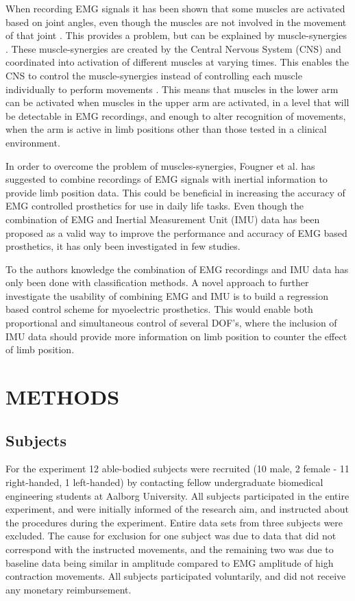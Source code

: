 \begin{multicols}{2}
When recording EMG signals it has been shown that some muscles are activated based on joint angles, even though the muscles are not involved in the movement of that joint \cite{Fougner2011}. This provides a problem, but can be explained by muscle-synergies \cite{DeRugy2013}. These muscle-synergies are created by the Central Nervous System (CNS) and coordinated into activation of different muscles at varying times. This enables the CNS to control the muscle-synergies instead of controlling each muscle individually to perform movements \cite{jiang2009}. This means that muscles in the lower arm can be activated when muscles in the upper arm are activated, in a level that will be detectable in EMG recordings, and enough to alter recognition of movements, when the arm is active in limb positions other than those tested in a clinical environment. 

In order to overcome the problem of muscles-synergies, Fougner et al. \cite{Fougner2011} has suggested to combine recordings of EMG signals with inertial information to provide limb position data. This could be beneficial in increasing the accuracy of EMG controlled prosthetics for use in daily life tasks. 
Even though the combination of EMG and Inertial Measurement Unit (IMU) data has been proposed as a valid way to improve the performance and accuracy of EMG based prosthetics, it has only been investigated in few studies. \cite{Roy2010, Imtiaz2014, jiang2012}

To the authors knowledge the combination of EMG recordings and IMU data has only been done with classification methods. A novel approach to further investigate the usability of combining EMG and IMU is to build a regression based control scheme for myoelectric prosthetics. This would enable both proportional and simultaneous control of several DOF's, where the inclusion of IMU data should provide more information on limb position to counter the effect of limb position.		
	
\section*{METHODS}%
	
%		
\subsection*{Subjects}
For the experiment 12 able-bodied subjects were recruited (10 male, 2 female - 11 right-handed, 1 left-handed) by contacting fellow undergraduate biomedical engineering students at Aalborg University. All subjects participated in the entire experiment, and were initially informed of the research aim, and instructed about the procedures during the experiment. Entire data sets from three subjects were excluded. The cause for exclusion for one subject was due to data that did not correspond with the instructed movements, and the remaining two was due to baseline data being similar in amplitude compared to EMG amplitude of high contraction movements. All subjects participated voluntarily, and did not receive any monetary reimbursement. 


\end{multicols}
